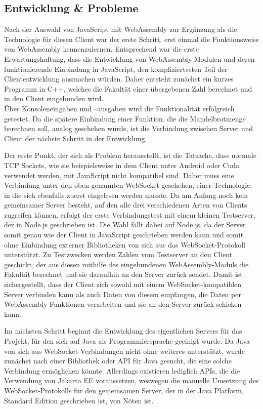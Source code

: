 \documentclass[12pt, onecolumn,notitlepage]{scrartcl}
\begin{document}
\subsection{Entwicklung \& Probleme}
Nach der Auswahl von JavaScript mit WebAssembly zur Ergänzung als die Technologie für diesen Client war der erste Schritt, erst einmal die Funktionsweise von WebAssembly kennenzulernen. Entsprechend war die erste Erwartungshaltung, dass die Entwicklung von WebAssembly-Modulen und deren funktionierende Einbindung in JavaScript, den kompliziertesten Teil der Cliententwicklung ausmachen würden. Daher entsteht zunächst ein kurzes Programm in C++, welches die Fakultät einer übergebenen Zahl berechnet und in den Client eingebunden wird. \\
Über Konsoleneingaben und –ausgaben wird die Funktionalität erfolgreich getestet. Da die spätere Einbindung einer Funktion, die die Mandelbrotmenge berechnen soll, analog geschehen würde, ist die Verbindung zwischen Server und Client der nächste Schritt in der Entwicklung. \par

Der erste Punkt, der sich als Problem herausstellt, ist die Tatsache, dass normale TCP Sockets, wie sie beispielsweise in dem Client unter Android oder Cuda verwendet werden, mit JavaScript nicht kompatibel sind. Daher muss eine Verbindung unter den oben genannten WebSocket geschehen, einer Technologie, in die sich ebenfalls zuerst eingelesen werden musste. Da am Anfang noch kein gemeinsamer Server besteht, auf den alle drei verschiedenen Arten von Clients zugreifen können, erfolgt der erste Verbindungstest mit einem kleinen Testserver, der in Node.js geschrieben ist. Die Wahl fällt dabei auf Node.js, da der Server somit genau wie der Client in JavaScript geschrieben werden kann und somit ohne Einbindung externer Bibliotheken von sich aus das WebSocket-Protokoll unterstützt. Zu Testzwecken werden Zahlen vom Testserver an den Client geschickt, der aus diesen mithilfe des eingebundenen WebAssembly-Moduls die Fakultät berechnet und sie daraufhin an den Server zurück sendet. Damit ist sichergestellt, dass der Client sich sowohl mit einem WebSocket-kompatiblen Server verbinden kann als auch Daten von diesem empfangen, die Daten per WebAssembly-Funktionen verarbeiten und sie an den Server zurück schicken kann. \par

Im nächsten Schritt beginnt die Entwicklung des eigentlichen Servers für das Projekt, für den sich auf Java als Programmiersprache geeinigt wurde. Da Java von sich aus WebSocket-Verbindungen nicht ohne weiteres unterstützt, wurde zunächst nach einer Bibliothek oder API für Java gesucht, die eine solche Verbindung ermöglichen könnte. Allerdings existieren lediglich APIs, die die Verwendung von Jakarta EE voraussetzen, weswegen die manuelle Umsetzung des WebSocket-Protokolls für den gemeinsamen Server, der in der Java Platform, Standard Edition geschrieben ist, von Nöten ist. \par
\end{document}
